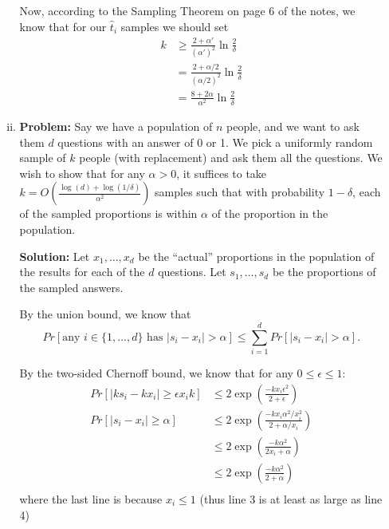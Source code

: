 \documentclass{article}
\newcommand{\sampavg}{\hat{t}}
\newcommand{\abs}[1]{\vert #1 \vert}
\begin{document}
\begin{enumerate}[(a)]
\begin{enumerate}[(i)]
                Now, according to the Sampling Theorem on page 6 of the notes, we know that for our $\sampavg_i$ samples
                we should set 
                \begin{align*}
                    k &\ge \frac{2+\alpha'}{(\alpha')^2} \ln \frac{2}{\delta} \\
                    &= \frac{2 + \alpha/2}{(\alpha/2)^2} \ln \frac{2}{\delta} \\
                    &= \frac{8 + 2\alpha}{\alpha^2} \ln \frac{2}{\delta}
                \end{align*}
            \item \textbf{Problem:} Say we have a population of $n$ people, and we want to ask them $d$ questions with an answer
                of 0 or 1.  We pick a uniformly random sample of $k$ people (with replacement) and ask them all the
                questions.  We wish to show that for any $\alpha > 0$, it suffices to take $k = O(\frac{\log(d) +
                \log(1/\delta)}{\alpha^2})$ samples such that with probability $1-\delta$, each of the sampled
                proportions is within $\alpha$ of the proportion in the population.
                
                \textbf{Solution:} Let $x_1, \ldots, x_d$ be the ``actual'' proportions in the population of the results for
                each of the $d$ questions.  Let $s_1, \ldots, s_d$ be the proportions of the sampled answers.

                By the union bound, we know that 
                \[Pr[\text{any }i \in \{1,\ldots,d\}\text{ has }\abs{s_i - x_i} >
                \alpha] \le \sum_{i=1}^d Pr[\abs{s_i - x_i} > \alpha].\]
                
                By the two-sided Chernoff bound, we know that for any $0 \le \epsilon \le 1$: 
                \begin{align*} 
                    Pr[\abs{ k s_i - k x_i } \ge \epsilon x_i k] &\le 2\exp\left(\frac{-kx_i\epsilon^2}{2+\epsilon}\right) \\
                    Pr[\abs{ s_i - x_i} \ge \alpha] &\le 2\exp\left( \frac{-kx_i\alpha^2/x_i^2}{2+\alpha/x_i} \right) \\
                    &\le 2\exp\left( \frac{-k\alpha^2}{2x_i + \alpha} \right) \\
                    &\le 2\exp\left( \frac{-k\alpha^2}{2 + \alpha} \right) \\
                \end{align*}
                where the last line is because $x_i \le 1$ (thus line 3 is at least as large as line 4)


\end{enumerate}
\end{enumerate}
\end{document}
